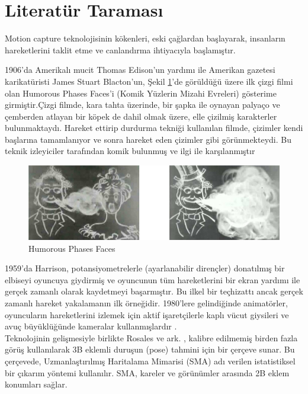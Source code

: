 \documentclass[12pt, a4paper]{article}
\begin{document}
\section{Literatür Taraması}

Motion capture teknolojisinin kökenleri, eski çağlardan başlayarak, insanların hareketlerini taklit etme ve canlandırma ihtiyacıyla başlamıştır.

1906’da Amerikalı mucit Thomas Edison’un yardımı ile Amerikan gazetesi karikatüristi
James Stuart Blacton’un, Şekil \ref{fig:boat1}'de görüldüğü üzere ilk çizgi filmi olan Humorous Phases Faces’i (Komik Yüzlerin Mizahi
Evreleri) gösterime girmiştir.Çizgi filmde, kara tahta üzerinde, bir şapka ile oynayan palyaço ve çemberden atlayan bir köpek de dahil olmak üzere, elle çizilmiş karakterler bulunmaktaydı. Hareket ettirip durdurma tekniği kullanılan filmde, çizimler kendi başlarına tamamlanıyor ve sonra hareket eden çizimler gibi görünmekteydi. Bu teknik izleyiciler tarafından komik bulunmuş ve ilgi ile karşılanmıştır \cite{erdem2021sanali}

\begin{figure}[!h]
	\centering
	\includegraphics[width=10 cm , height = 3 cm ]{film.png}
	\caption{Humorous Phases Faces}
	\label{fig:boat1}
\end{figure}


1959’da Harrison, potansiyometrelerle (ayarlanabilir
dirençler) donatılmış bir elbiseyi oyuncuya giydirmiş ve oyuncunun tüm hareketlerini bir ekran
yardımı ile gerçek zamanlı olarak kaydetmeyi başarmıştır. Bu ilkel bir teçhizattı ancak gerçek
zamanlı hareket yakalamanın ilk örneğidir. 1980’lere gelindiğinde animatörler,
oyuncuların hareketlerini izlemek için aktif işaretçilerle kaplı vücut giysileri ve avuç
büyüklüğünde kameralar kullanmışlardır \cite{erdem2021sanali}. \\

Teknolojinin gelişmesiyle birlikte Rosales ve ark. \cite{rosalesestimating}, kalibre edilmemiş birden fazla görüş kullanılarak 3B eklemli duruşun (pose) tahmini için bir çerçeve sunar. Bu çerçevede, Uzmanlaştırılmış Haritalama Mimarisi (SMA) adı verilen istatistiksel bir çıkarım yöntemi kullanılır. SMA, kareler ve görünümler arasında 2B eklem konumları sağlar.\\
\end{document}
